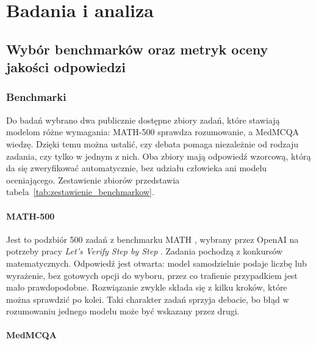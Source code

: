 \chapter{Badania i analiza}
\label{chap:badania-i-analiza}

\section{Wybór benchmarków oraz metryk oceny jakości odpowiedzi}

\subsection{Benchmarki}
\label{sec:benchmarki}

Do badań wybrano dwa publicznie dostępne zbiory zadań, które stawiają modelom różne wymagania: MATH-500 sprawdza rozumowanie, a MedMCQA wiedzę. Dzięki temu można ustalić, czy debata pomaga niezależnie od rodzaju zadania, czy tylko w jednym z nich. Oba zbiory mają odpowiedź wzorcową, którą da się zweryfikować automatycznie, bez udziału człowieka ani modelu oceniającego. Zestawienie zbiorów przedstawia tabela~\ref{tab:zestawienie_benchmarkow}.



\subsubsection{MATH-500}

Jest to podzbiór 500 zadań z benchmarku MATH \cite{hendrycksmath2021}, wybrany przez OpenAI na potrzeby pracy \emph{Let's Verify Step by Step} \cite{lightman2023verify}. Zadania pochodzą z konkursów matematycznych. Odpowiedź jest otwarta: model samodzielnie podaje liczbę lub wyrażenie, bez gotowych opcji do wyboru, przez co trafienie przypadkiem jest mało prawdopodobne. Rozwiązanie zwykle składa się z kilku kroków, które można sprawdzić po kolei. Taki charakter zadań sprzyja debacie, bo błąd w rozumowaniu jednego modelu może być wskazany przez drugi.

\subsubsection{MedMCQA} 

